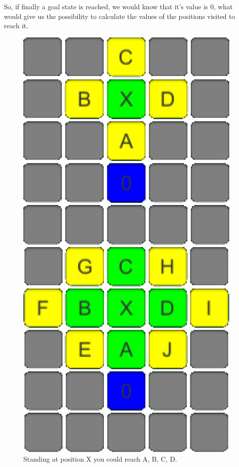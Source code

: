 \documentclass[conference]{IEEEtran}
\begin{document}
So, if finally a goal state is reached, we would know that it's value is $0$, what would give us the possibility to calculate the values of the positions visited to reach it.\\
\begin{figure}[h]
\centering
\begin{minipage}[t]{0.3\linewidth}
\centering
\includegraphics[width=1\textwidth]{images/ValueFunction/01.png}
\caption{Standing at position X you could reach A, B, C, D.}
\end{minipage}
\hfill
\begin{minipage}[t]{0.3\linewidth}
\centering
\includegraphics[width=1\textwidth]{images/ValueFunction/02.png}

\end{minipage}
\end{figure}
\end{document}
